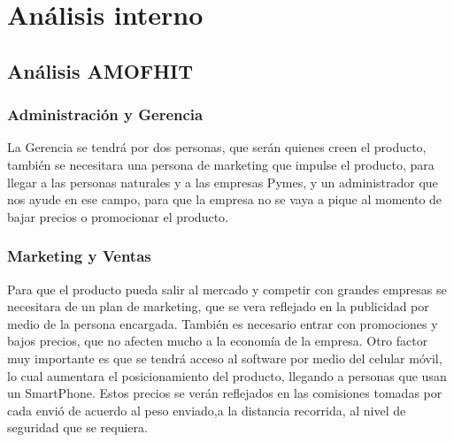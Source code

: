 \section{Análisis interno}

\subsection{Análisis AMOFHIT}
\subsubsection{Administración y Gerencia}
La Gerencia se tendrá por dos personas, que serán quienes creen el producto, también se necesitara una persona de marketing que impulse el producto, para llegar a las personas naturales y a las empresas Pymes, y un administrador que nos ayude en ese campo, para que la empresa no se vaya a pique al momento de bajar precios o promocionar el producto. 

\subsubsection{Marketing y Ventas}
Para que el producto pueda salir al mercado y competir con grandes empresas se necesitara de un plan de marketing, que se vera reflejado en la publicidad por medio de la persona encargada. También es necesario entrar con promociones y bajos precios, que no afecten mucho a la economía de la empresa. Otro factor muy importante es que se tendrá acceso al software por medio del celular móvil, lo cual aumentara el posicionamiento del producto, llegando a personas que usan un SmartPhone.
Estos precios se verán reflejados en las comisiones tomadas por cada envió de acuerdo al peso enviado,a la distancia recorrida, al nivel de seguridad que se requiera.

